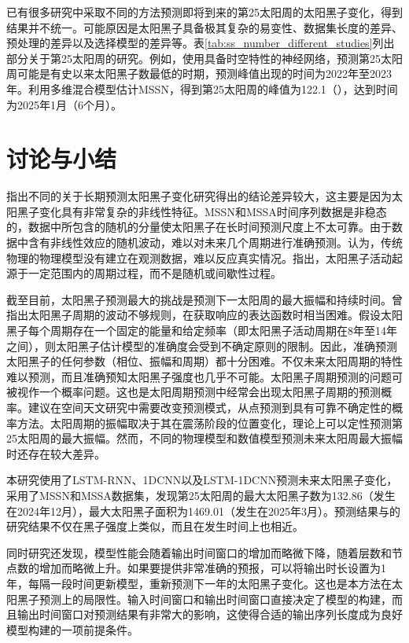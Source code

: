 已有很多研究中采取不同的方法预测即将到来的第25太阳周的太阳黑子变化，得到结果并不统一。可能原因是太阳黑子具备极其复杂的易变性、数据集长度的差异、预处理的差异以及选择模型的差异等。表\ref{tab:ss_number_different_studies}列出部分关于第25太阳周的研究。例如，\citet{covas2019neural}使用具备时空特性的神经网络，预测第25太阳周可能是有史以来太阳黑子数最低的时期，预测峰值出现的时间为2022年至2023年。\citet{okoh2018hybrid}利用多维混合模型估计MSSN，得到第25太阳周的峰值为122.1（），达到时间为2025年1月（\pm 6个月）。

\section{讨论与小结}\label{sec:ss_conclusion}

\citet{solanki2011analyzing}指出不同的关于长期预测太阳黑子变化研究得出的结论差异较大，这主要是因为太阳黑子变化具有非常复杂的非线性特征。MSSN和MSSA时间序列数据是非稳态的，数据中所包含的随机的分量使太阳黑子在长时间预测尺度上不太可靠。由于数据中含有非线性效应的随机波动，难以对未来几个周期进行准确预测\citep{charbonneau2010dynamo,petrovay2010solar}。\citet{charbonneau2010dynamo}认为，传统物理的物理模型没有建立在观测数据，难以反应真实情况。\citet{mendoza2011mid}指出，太阳黑子活动起源于一定范围内的周期过程，而不是随机或间歇性过程。

截至目前，太阳黑子预测最大的挑战是预测下一太阳周的最大振幅和持续时间\citep{petrovay2010solar}。\citet{gleissberg1939long}曾指出太阳黑子周期的波动不够规则，在获取响应的表达函数时相当困难。\citet{herrera2015reconstruction}假设太阳黑子每个周期存在一个固定的能量和给定频率（即太阳黑子活动周期在8年至14年之间），则太阳黑子估计模型的准确度会受到不确定原则的限制。因此，准确预测太阳黑子的任何参数（相位、振幅和周期）都十分困难。不仅未来太阳周期的特性难以预测，而且准确预知太阳黑子强度也几乎不可能。太阳黑子周期预测的问题可被视作一个概率问题。这也是太阳周期预测中经常会出现太阳黑子周期的预测概率。\citet{camporeale2019challenge}建议在空间天文研究中需要改变预测模式，从点预测到具有可靠不确定性的概率方法。太阳周期的振幅取决于其在震荡阶段的位置变化，理论上可以定性预测第25太阳周的最大振幅。然而，不同的物理模型和数值模型预测未来太阳周最大振幅时还存在较大差异。

本研究使用了LSTM-RNN、1DCNN以及LSTM-1DCNN预测未来太阳黑子变化，采用了MSSN和MSSA数据集，发现第25太阳周的最大太阳黑子数为132.86（发生在2024年12月），最大太阳黑子面积为1469.01（发生在2025年3月）。预测结果与\citet{covas2019neural}的研究结果不仅在黑子强度上类似，而且在发生时间上也相近。

同时研究还发现，模型性能会随着输出时间窗口的增加而略微下降，随着层数和节点数的增加而略微上升。如果要提供非常准确的预报，可以将输出时长设置为1年，每隔一段时间更新模型，重新预测下一年的太阳黑子变化。这也是本方法在太阳黑子预测上的局限性。输入时间窗口和输出时间窗口直接决定了模型的构建，而且输出时间窗口对预测结果有非常大的影响，这使得合适的输出序列长度成为良好模型构建的一项前提条件。
